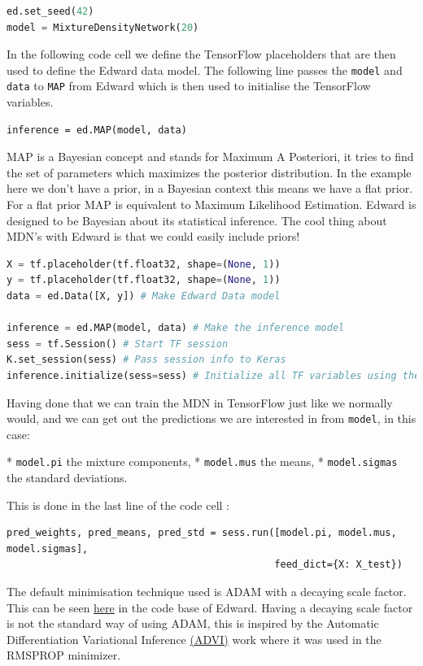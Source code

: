 \begin{lstlisting}[language=Python]
ed.set_seed(42)
model = MixtureDensityNetwork(20)
\end{lstlisting}

In the following code cell we define the TensorFlow placeholders that are then used to define the Edward data model.
The following line passes the \texttt{model} and \texttt{data} to \texttt{MAP} from Edward which is then used to initialise the TensorFlow variables.

\begin{lstlisting}
inference = ed.MAP(model, data)
\end{lstlisting}

MAP is a Bayesian concept and stands for Maximum A Posteriori, it tries to find the set of parameters which maximizes the posterior distribution. In the example here we don't have a prior, in a Bayesian context this means we have a flat prior. For a flat prior MAP is equivalent to Maximum Likelihood Estimation. Edward is designed to be Bayesian about its statistical inference. The cool thing about MDN's with Edward is that we could easily include priors!

\begin{lstlisting}[language=Python]
X = tf.placeholder(tf.float32, shape=(None, 1))
y = tf.placeholder(tf.float32, shape=(None, 1))
data = ed.Data([X, y]) # Make Edward Data model

inference = ed.MAP(model, data) # Make the inference model
sess = tf.Session() # Start TF session
K.set_session(sess) # Pass session info to Keras
inference.initialize(sess=sess) # Initialize all TF variables using the Edward interface
\end{lstlisting}

Having done that we can train the MDN in TensorFlow just like we normally would, and we can get out the predictions we are interested in from \texttt{model}, in this case:

* \texttt{model.pi} the mixture components,
* \texttt{model.mus} the means,
* \texttt{model.sigmas} the standard  deviations.

This is done in the last line of the code cell :
\begin{lstlisting}
pred_weights, pred_means, pred_std = sess.run([model.pi, model.mus, model.sigmas],
                                              feed_dict={X: X_test})
\end{lstlisting}

The default minimisation technique used is ADAM with a decaying scale factor.
This can be seen \href{https://github.com/blei-lab/edward/blob/master/edward/inferences.py#L94}{here} in the code base of Edward. Having a decaying scale factor is not the standard way of using ADAM, this is inspired by the Automatic Differentiation Variational Inference \href{http://arxiv.org/abs/1603.00788}{(ADVI)} work where it was used in the RMSPROP minimizer.

